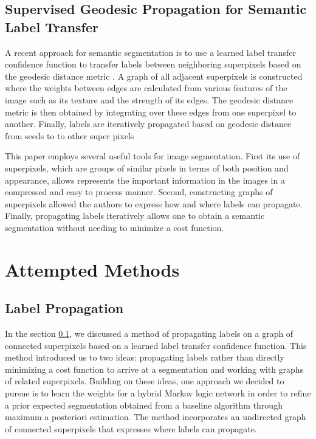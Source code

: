\documentclass{article} %
\begin{document}
\subsection{Supervised Geodesic Propagation for Semantic Label Transfer}
\label{sec:Geo}

A recent approach for semantic segmentation is to use a learned label transfer confidence function to transfer labels between neighboring superpixels based on the geodesic distance metric \cite{Chen2012}.  A graph of all adjacent superpixels is constructed where the weights between edges are calculated from various features of the image such as its texture and the strength of its edges. The geodesic distance metric is then obtained by integrating over these edges from one superpixel to another. Finally, labels are iteratively propagated based on geodesic distance from seeds to to other super pixels

This paper employs several useful tools for image segmentation. First its use of superpixels, which are groups of similar pixels in terms of both position and appearance, allows represents the important information in the images in a compressed and easy to process manner. Second, constructing graphs of superpixels allowed the authors to express how and where labels can propagate. Finally, propagating labels iteratively allows one to obtain a semantic segmentation without needing to minimize a cost function.


\section{Attempted Methods}
\label{sec:Attempt}
\subsection{Label Propagation}
\label{sec:AttemptLabProp}

	In the section \ref{sec:Geo}, we discussed a method of propagating labels on a graph of connected superpixels based on a learned label transfer confidence function. This method introduced us to two ideas: propagating labels rather than directly minimizing a cost function to arrive at a segmentation and working with graphs of related superpixels. Building on these ideas, one approach we decided to pursue is to learn the weights for a hybrid Markov logic network in order to refine a prior expected segmentation obtained from a baseline algorithm through maximum a posteriori estimation. The method incorporates an undirected graph of connected superpixels that expresses where labels can propagate.
\end{document}
